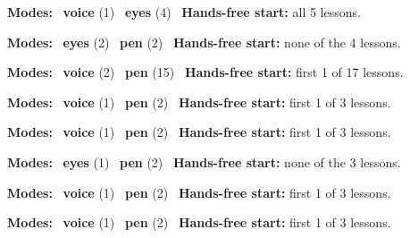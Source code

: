 \expandafter\def\csname hlchaptermodality5\endcsname{%
  {\small\noindent
    \textbf{Modes:} \hlvoicesign{}~\textbf{voice} (1) \quad \hlsightsign{}~\textbf{eyes} (4)\quad
    \hlvoicesign{}~\textbf{Hands-free start:} all 5 lessons.%
    \par}\medskip
}

\expandafter\def\csname hlchaptermodality6\endcsname{%
  {\small\noindent
    \textbf{Modes:} \hlsightsign{}~\textbf{eyes} (2) \quad \hlpensign{}~\textbf{pen} (2)\quad
    \hlvoicesign{}~\textbf{Hands-free start:} none of the 4 lessons.%
    \par}\medskip
}

\expandafter\def\csname hlchaptermodality7\endcsname{%
  {\small\noindent
    \textbf{Modes:} \hlvoicesign{}~\textbf{voice} (2) \quad \hlpensign{}~\textbf{pen} (15)\quad
    \hlvoicesign{}~\textbf{Hands-free start:} first 1 of 17 lessons.%
    \par}\medskip
}

\expandafter\def\csname hlchaptermodality8\endcsname{%
  {\small\noindent
    \textbf{Modes:} \hlvoicesign{}~\textbf{voice} (1) \quad \hlpensign{}~\textbf{pen} (2)\quad
    \hlvoicesign{}~\textbf{Hands-free start:} first 1 of 3 lessons.%
    \par}\medskip
}

\expandafter\def\csname hlchaptermodality9\endcsname{%
  {\small\noindent
    \textbf{Modes:} \hlvoicesign{}~\textbf{voice} (1) \quad \hlpensign{}~\textbf{pen} (2)\quad
    \hlvoicesign{}~\textbf{Hands-free start:} first 1 of 3 lessons.%
    \par}\medskip
}

\expandafter\def\csname hlchaptermodality10\endcsname{%
  {\small\noindent
    \textbf{Modes:} \hlsightsign{}~\textbf{eyes} (1) \quad \hlpensign{}~\textbf{pen} (2)\quad
    \hlvoicesign{}~\textbf{Hands-free start:} none of the 3 lessons.%
    \par}\medskip
}

\expandafter\def\csname hlchaptermodality11\endcsname{%
  {\small\noindent
    \textbf{Modes:} \hlvoicesign{}~\textbf{voice} (1) \quad \hlpensign{}~\textbf{pen} (2)\quad
    \hlvoicesign{}~\textbf{Hands-free start:} first 1 of 3 lessons.%
    \par}\medskip
}

\expandafter\def\csname hlchaptermodality12\endcsname{%
  {\small\noindent
    \textbf{Modes:} \hlvoicesign{}~\textbf{voice} (1) \quad \hlpensign{}~\textbf{pen} (2)\quad
    \hlvoicesign{}~\textbf{Hands-free start:} first 1 of 3 lessons.%
    \par}\medskip
}


